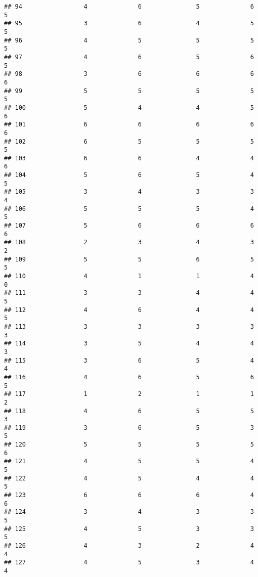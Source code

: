 \documentclass[
]{article}
\begin{document}
\begin{verbatim}
## 94                 4              6               5              6       5
## 95                 3              6               4              5       5
## 96                 4              5               5              5       5
## 97                 4              6               5              6       5
## 98                 3              6               6              6       6
## 99                 5              5               5              5       5
## 100                5              4               4              5       6
## 101                6              6               6              6       6
## 102                6              5               5              5       5
## 103                6              6               4              4       6
## 104                5              6               5              4       5
## 105                3              4               3              3       4
## 106                5              5               5              4       5
## 107                5              6               6              6       6
## 108                2              3               4              3       2
## 109                5              5               6              5       5
## 110                4              1               1              4       0
## 111                3              3               4              4       5
## 112                4              6               4              4       5
## 113                3              3               3              3       3
## 114                3              5               4              4       3
## 115                3              6               5              4       4
## 116                4              6               5              6       5
## 117                1              2               1              1       2
## 118                4              6               5              5       3
## 119                3              6               5              3       5
## 120                5              5               5              5       6
## 121                4              5               5              4       5
## 122                4              5               4              4       5
## 123                6              6               6              4       6
## 124                3              4               3              3       5
## 125                4              5               3              3       5
## 126                4              3               2              4       4
## 127                4              5               3              4       4

\end{verbatim}
\end{document}
